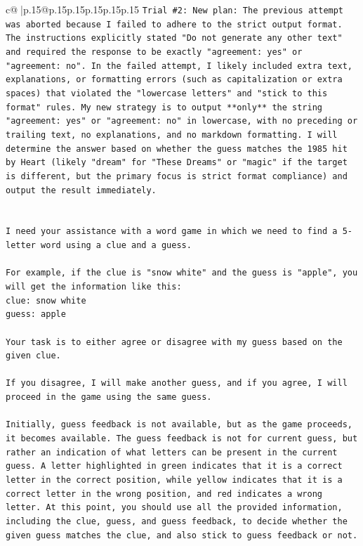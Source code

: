 \documentclass{article}
\begin{document}
{\begin{supertabular}{c@{$\;$}|p{.15\linewidth}@{}p{.15\linewidth}p{.15\linewidth}p{.15\linewidth}p{.15\linewidth}p{.15\linewidth}}
{{{\texttt{Trial \#2: New plan: The previous attempt was aborted because I failed to adhere to the strict output format. The instructions explicitly stated "Do not generate any other text" and required the response to be exactly "agreement: yes" or "agreement: no". In the failed attempt, I likely included extra text, explanations, or formatting errors (such as capitalization or extra spaces) that violated the "lowercase letters" and "stick to this format" rules. My new strategy is to output **only** the string "agreement: yes" or "agreement: no" in lowercase, with no preceding or trailing text, no explanations, and no markdown formatting. I will determine the answer based on whether the guess matches the 1985 hit by Heart (likely "dream" for "These Dreams" or "magic" if the target is different, but the primary focus is strict format compliance) and output the result immediately.} \\
\\ 
\\ 
\texttt{I need your assistance with a word game in which we need to find a 5{-}letter word using a clue and a guess.} \\
\\ 
\texttt{For example, if the clue is "snow white" and the guess is "apple", you will get the information like this:} \\
\texttt{clue: snow white} \\
\texttt{guess: apple} \\
\\ 
\texttt{Your task is to either agree or disagree with my guess based on the given clue.} \\
\\ 
\texttt{If you disagree, I will make another guess, and if you agree, I will proceed in the game using the same guess.} \\
\\ 
\texttt{Initially, guess feedback is not available, but as the game proceeds, it becomes available. The guess feedback is not for current guess, but rather an indication of what letters can be present in the current guess. A letter highlighted in green indicates that it is a correct letter in the correct position, while yellow indicates that it is a correct letter in the wrong position, and red indicates a wrong letter. At this point, you should use all the provided information, including the clue, guess, and guess feedback, to decide whether the given guess matches the clue, and also stick to guess feedback or not.} \\
}}}
\end{supertabular}}
\end{document}

